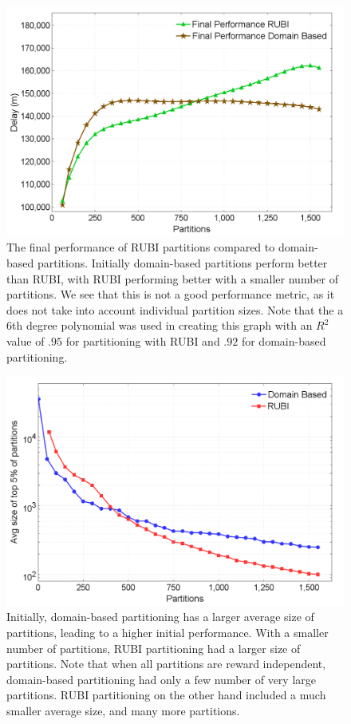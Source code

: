 \documentclass[onehalf,11pt]{beavtex}
\begin{document}

\begin{figure}
\centering
\includegraphics[width=1.0\columnwidth]{FinalOldvsFinalNew}
\caption{The final performance of RUBI partitions compared to domain-based partitions. Initially domain-based partitions perform better than RUBI, with RUBI performing better with a smaller number of partitions. We see that this is not a good performance metric, as it does not take into account individual partition sizes. Note that the a 6th degree polynomial was used in creating this graph with an $R^2$ value of $.95$ for partitioning with RUBI and $.92$ for domain-based partitioning.}
\label{FinalOldvsFinalNew}
\end{figure}

\begin{figure}
\centering
\includegraphics[width=1.0\columnwidth]{OldvsNewAvgSize}
\caption{Initially, domain-based partitioning has a larger average size of partitions, leading to a higher initial performance. With a smaller number of partitions, RUBI partitioning had a larger size of partitions. Note that when all partitions are reward independent, domain-based partitioning had only a few number of very large partitions. RUBI partitioning on the other hand included a much smaller average size, and many more partitions. }
\label{OldvsNewAvgSize}
\end{figure}
\end{document}
